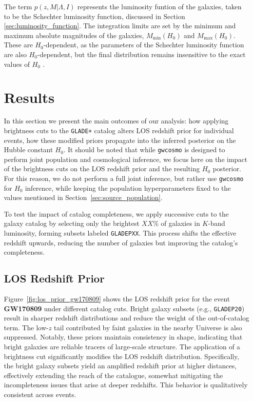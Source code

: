 The term $p(z,M|\Lambda, I)$ represents the luminosity funtion of the galaxies, taken to be the Schechter luminosity function, discussed in Section \ref{sec:luminosity_function}. The integration limits are set by the minimum and maximum absolute magnitudes of the galaxies, $M_{\mathrm{min}}(H_0)$ and $M_{\mathrm{max}}(H_0)$. These are $H_0$-dependent, as the parameters of the Schechter luminosity function are also $H_0$-dependent, but the final distribution remains insensitive to the exact values of $H_0$ \citep{gray2023joint}.

\section{Results}
In this section we present the main outcomes of our analysis: how applying brightness cuts to the \texttt{GLADE+} catalog alters \ac{LOS} redshift prior for individual events, how these modified priors propagate into the inferred posterior on the Hubble constant $H_0$. It should be noted that while \texttt{gwcosmo} is designed to perform joint population and cosmological inference, we focus here on the impact of the brightness cuts on the \ac{LOS} redshift prior and the resulting $H_0$ posterior. For this reason, we do not perform a full joint inference, but rather use \texttt{gwcosmo} for $H_0$ inference, while keeping the population hyperparameters fixed to the values mentioned in Section~\ref{sec:source_population}.

To test the impact of catalog completeness, we apply successive cuts to the galaxy catalog by selecting only the brightest $XX\%$ of galaxies in $K$-band luminosity, forming subsets labeled \texttt{GLADEPXX}. This process shifts the effective redshift upwards, reducing the number of galaxies but improving the catalog's completeness.

\subsection{\ac{LOS} Redshift Prior}
Figure~\ref{fig:los_prior_gw170809} shows the LOS redshift prior for the event \textbf{GW170809} under different catalog cuts. Bright galaxy subsets (e.g., \texttt{GLADEP20}) result in sharper redshift distributions and reduce the weight of the out-of-catalog term. The low-$z$ tail contributed by faint galaxies in the nearby Universe is also suppressed. Notably, these priors maintain consistency in shape, indicating that bright galaxies are reliable tracers of large-scale structure. The application of a brightness cut significantly modifies the \ac{LOS} redshift distribution. Specifically, the bright galaxy subsets yield an amplified redshift prior at higher distances, effectively extending the reach of the catalogue, somewhat mitigating the incompleteness issues that arise at deeper redshifts. This behavior is qualitatively consistent across events.

